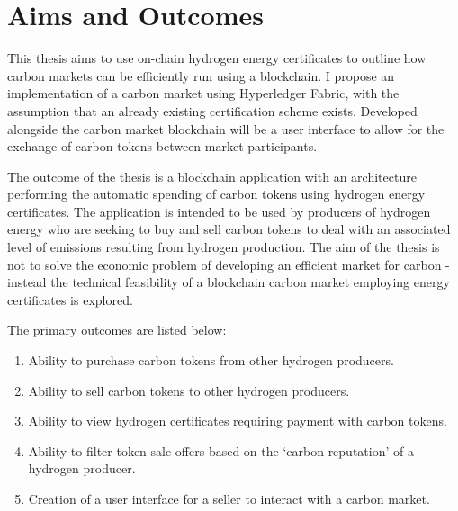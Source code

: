 \section{Aims and Outcomes}

This thesis aims to use on-chain hydrogen energy certificates to
outline how carbon markets can be efficiently run using a blockchain.
I propose an implementation of a carbon market using Hyperledger
Fabric, with the assumption that an already existing
certification scheme exists. Developed alongside the carbon
market blockchain will be a user interface to allow for the
exchange of carbon tokens between market participants.

The outcome of the thesis is a blockchain application with an architecture
performing the automatic spending of carbon tokens using hydrogen
energy certificates. The application is intended to be used by
producers of hydrogen energy who are seeking to buy and sell carbon
tokens to deal with an associated level of emissions resulting from
hydrogen production. The aim of the thesis is not
to solve the economic problem of developing an efficient
market for carbon - instead the technical feasibility of
a blockchain carbon market employing energy
certificates is explored.

The primary outcomes are listed below:
\begin{enumerate}
    \item Ability to purchase carbon tokens from other hydrogen producers.
    \item Ability to sell carbon tokens to other hydrogen producers.
    \item Ability to view hydrogen certificates requiring payment with
          carbon tokens.
    \item Ability to filter token sale offers based on the `carbon reputation'
          of a hydrogen producer.
    \item Creation of a user interface for a seller to interact with a carbon
          market.
\end{enumerate}